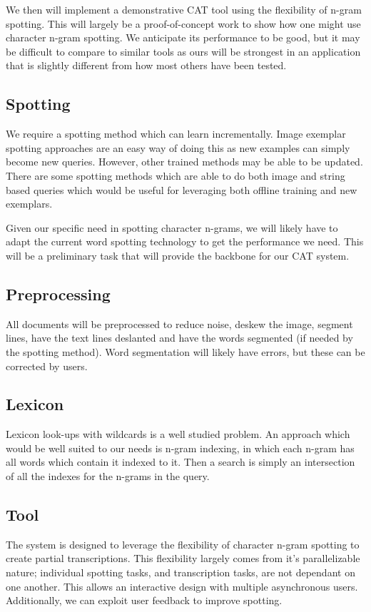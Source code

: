 \documentclass[ms]{byuprop}
\begin{document}
We then will implement a demonstrative CAT tool using the flexibility of n-gram spotting. This will largely be a proof-of-concept work to show how one might use character n-gram spotting. We anticipate its performance to be good, but it may be difficult to compare to similar tools as ours will be strongest in an application that is slightly different from how most others have been tested.


\subsection{Spotting}
We require a spotting method which can learn incrementally. Image exemplar spotting approaches are an easy way of doing this as new examples can simply become new queries. However, other trained methods may be able to be updated. There are some spotting methods which are able to do both image and string based queries\cite{Almazan2014} which would be useful for leveraging both offline training and new exemplars.

Given our specific need in spotting character n-grams, we will likely have to adapt the current word spotting technology to get the performance we need. This will be a preliminary task that will provide the backbone for our CAT system.

\subsection{Preprocessing}
All documents will be preprocessed to reduce noise, deskew the image, segment lines, have the text lines deslanted and have the words segmented (if needed by the spotting method). Word segmentation will likely have errors, but these can be corrected by users.

\subsection{Lexicon}
Lexicon look-ups with wildcards is a well studied problem. An approach which would be well suited to our needs is n-gram indexing, in which each n-gram has all words which contain it indexed to it. Then a search is simply an intersection of all the indexes for the n-grams in the query.

\subsection{Tool}
The system is designed to leverage the flexibility of character n-gram spotting to create partial transcriptions. This flexibility largely comes from it's parallelizable nature; individual spotting tasks, and transcription tasks, are not dependant on one another. This allows an interactive design with multiple asynchronous users. Additionally, we can exploit user feedback to improve spotting.
\end{document}
